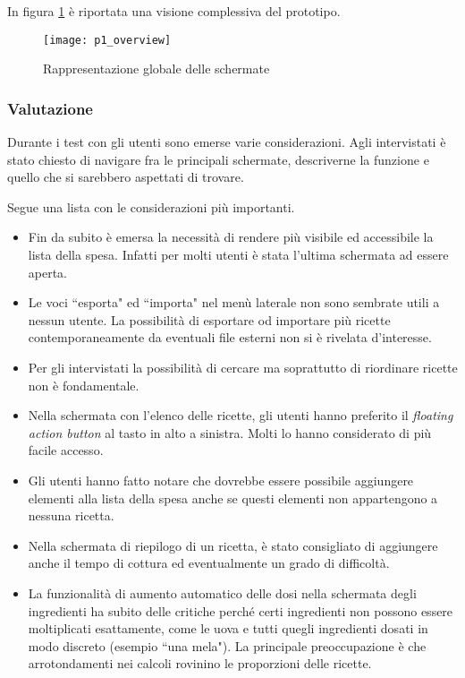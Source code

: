 \clearpage
In figura \ref{fig:p1_overview} è riportata una visione complessiva del prototipo.

\begin{figure}[ht]
  \begin{center}
    \texttt{[image: p1\_overview]}
    \caption{Rappresentazione globale delle schermate}
    \label{fig:p1_overview}
  \end{center}
\end{figure}

\subsubsection{Valutazione}
Durante i test con gli utenti sono emerse varie considerazioni.
Agli intervistati è stato chiesto di navigare fra le principali schermate, descriverne la funzione e quello che si sarebbero aspettati di trovare.

Segue una lista con le considerazioni più importanti.
\begin{itemize}
  \item Fin da subito è emersa la necessità di rendere più visibile ed accessibile la lista della spesa.
    Infatti per molti utenti è stata l'ultima schermata ad essere aperta.

  \item Le voci ``esporta" ed ``importa" nel menù laterale non sono sembrate utili a nessun utente.
    La possibilità di esportare od importare più ricette contemporaneamente da eventuali file esterni non si è rivelata d'interesse.

  \item Per gli intervistati la possibilità di cercare ma soprattutto di riordinare ricette non è fondamentale.

\item Nella schermata con l'elenco delle ricette, gli utenti hanno preferito il \textit{floating action button} al tasto in alto a sinistra.
  Molti lo hanno considerato di più facile accesso.

  \item Gli utenti hanno fatto notare che dovrebbe essere possibile aggiungere elementi alla lista della spesa anche se questi elementi non appartengono a nessuna ricetta.

  \item Nella schermata di riepilogo di un ricetta, è stato consigliato di aggiungere anche il tempo di cottura ed eventualmente un grado di difficoltà.

  \item La funzionalità di aumento automatico delle dosi nella schermata degli ingredienti ha subito delle critiche perché certi ingredienti non possono essere moltiplicati esattamente, come le uova e tutti quegli ingredienti dosati in modo discreto (esempio ``una mela").
    La principale preoccupazione è che arrotondamenti nei calcoli rovinino le proporzioni delle ricette.
\end{itemize}

